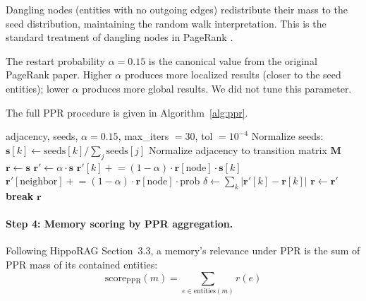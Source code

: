 \documentclass[11pt]{article}
\begin{document}
Dangling nodes (entities with no outgoing edges) redistribute their
mass to the seed distribution, maintaining the random walk
interpretation.  This is the standard treatment of dangling nodes in
PageRank \citep{Langville2005}.

The restart probability $\alpha = 0.15$ is the canonical value from
the original PageRank paper.  Higher $\alpha$ produces more localized
results (closer to the seed entities); lower $\alpha$ produces more
global results.  We did not tune this parameter.

The full PPR procedure is given in Algorithm~\ref{alg:ppr}.

\begin{algorithm}[t]
\caption{Personalized PageRank (Phase~2)}
\label{alg:ppr}
\begin{algorithmic}[1]
\REQUIRE adjacency, seeds, $\alpha = 0.15$, max\_iters $= 30$, tol $= 10^{-4}$
\STATE Normalize seeds: $\mathbf{s}[k] \leftarrow \text{seeds}[k] / \sum_j \text{seeds}[j]$
\STATE Normalize adjacency to transition matrix $\mathbf{M}$
\STATE $\mathbf{r} \leftarrow \mathbf{s}$ 
  \STATE $\mathbf{r}' \leftarrow \alpha \cdot \mathbf{s}$ 
        \STATE $\mathbf{r}'[k] \mathrel{+}= (1 - \alpha) \cdot \mathbf{r}[\text{node}] \cdot \mathbf{s}[k]$
      \ENDFOR
    \ELSE
        \STATE $\mathbf{r}'[\text{neighbor}] \mathrel{+}= (1 - \alpha) \cdot \mathbf{r}[\text{node}] \cdot \text{prob}$
      \ENDFOR
    \ENDIF
  \ENDFOR
  \STATE $\delta \leftarrow \sum_k |\mathbf{r}'[k] - \mathbf{r}[k]|$
  \STATE $\mathbf{r} \leftarrow \mathbf{r}'$
    \STATE \textbf{break}
  \ENDIF
\ENDFOR
\RETURN $\mathbf{r}$
\end{algorithmic}
\end{algorithm}

\paragraph{Step 4: Memory scoring by PPR aggregation.}
Following HippoRAG Section~3.3, a memory's relevance under PPR is the
sum of PPR mass of its contained entities:
\begin{equation}
\text{score}_{\text{PPR}}(m) = \sum_{e \in \text{entities}(m)} r(e)
\label{eq:ppr-score}
\end{equation}
\end{document}
